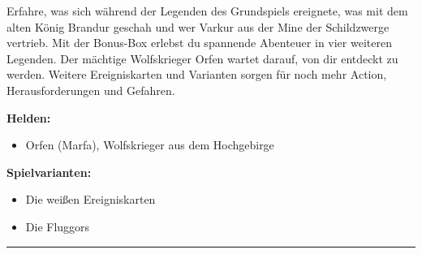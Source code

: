 \documentclass[10pt, a4paper, oneside]{book}
\begin{document}
\begin{multicols}{2}
Erfahre, was sich während der Legenden des Grundspiels ereignete, was mit dem alten König Brandur geschah und wer Varkur aus der Mine der Schildzwerge vertrieb. Mit der Bonus-Box erlebst du spannende Abenteuer in vier weiteren Legenden. Der mächtige Wolfskrieger Orfen wartet darauf, von dir entdeckt zu werden. Weitere Ereigniskarten und Varianten sorgen für noch mehr Action, Herausforderungen und Gefahren.\bigskip

\textbf{Helden:} 

\begin{itemize}[topsep=0pt,itemsep=-1ex,partopsep=1ex,parsep=1ex]
    \item Orfen (Marfa), Wolfskrieger aus dem Hochgebirge\bigskip
\end{itemize}

\textbf{Spielvarianten:} 

\begin{itemize}[topsep=0pt,itemsep=-1ex,partopsep=1ex,parsep=1ex]
    \item Die weißen Ereigniskarten
    \item Die Fluggors
\end{itemize}


\vspace*{5em}

\end{multicols}

\hrule
\end{document}
